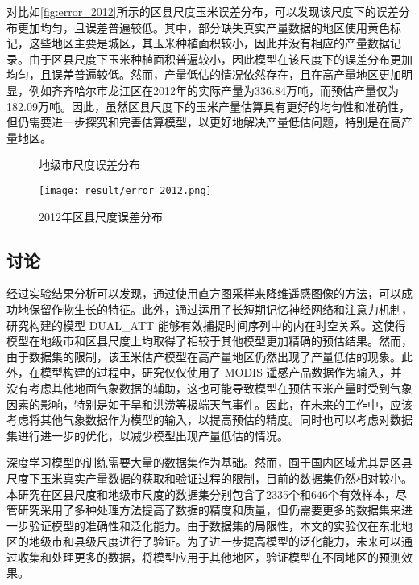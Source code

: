 \par 对比如\autoref{fig:error_2012}所示的区县尺度玉米误差分布，可以发现该尺度下的误差分布更加均匀，且误差普遍较低。其中，部分缺失真实产量数据的地区使用黄色标记，这些地区主要是城区，其玉米种植面积较小，因此并没有相应的产量数据记录。由于区县尺度下玉米种植面积普遍较小，因此模型在该尺度下的误差分布更加均匀，且误差普遍较低。然而，产量低估的情况依然存在，且在高产量地区更加明显，例如齐齐哈尔市龙江区在2012年的实际产量为336.84万吨，而预估产量仅为182.09万吨。因此，虽然区县尺度下的玉米产量估算具有更好的均匀性和准确性，但仍需要进一步探究和完善估算模型，以更好地解决产量低估问题，特别是在高产量地区。

\begin{figure}
  \centering
  \hfill
\end{figure}
\begin{figure}\ContinuedFloat
  \centering
  \caption{地级市尺度误差分布}
\end{figure}
\begin{figure}[ht]
  \centering
  \texttt{[image: result/error\_2012.png]}
  \caption{\label{fig:error_2012}2012年区县尺度误差分布}
\end{figure}

\subsection{讨论}
\par 经过实验结果分析可以发现，通过使用直方图采样来降维遥感图像的方法，可以成功地保留作物生长的特征。此外，通过运用了长短期记忆神经网络和注意力机制，研究构建的模型 DUAL\_ATT 能够有效捕捉时间序列中的内在时空关系。这使得模型在地级市和区县尺度上均取得了相较于其他模型更加精确的预估结果。然而，由于数据集的限制，该玉米估产模型在高产量地区仍然出现了产量低估的现象。此外，在模型构建的过程中，研究仅仅使用了 MODIS 遥感产品数据作为输入，并没有考虑其他地面气象数据的辅助，这也可能导致模型在预估玉米产量时受到气象因素的影响，特别是如干旱和洪涝等极端天气事件。因此，在未来的工作中，应该考虑将其他气象数据作为模型的输入，以提高预估的精度。同时也可以考虑对数据集进行进一步的优化，以减少模型出现产量低估的情况。

\par 深度学习模型的训练需要大量的数据集作为基础。然而，囿于国内区域尤其是区县尺度下玉米真实产量数据的获取和验证过程的限制，目前的数据集仍然相对较小。本研究在区县尺度和地级市尺度的数据集分别包含了2335个和646个有效样本，尽管研究采用了多种处理方法提高了数据的精度和质量，但仍需要更多的数据集来进一步验证模型的准确性和泛化能力。由于数据集的局限性，本文的实验仅在东北地区的地级市和县级尺度进行了验证。为了进一步提高模型的泛化能力，未来可以通过收集和处理更多的数据，将模型应用于其他地区，验证模型在不同地区的预测效果。

